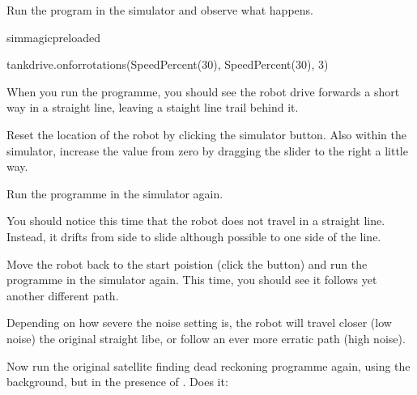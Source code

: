 \documentclass[letterpaper,10pt,english]{sphinxmanual}
\begin{document}
Run the program in the simulator and observe what happens.

{
\begin{sphinxVerbatim}[commandchars=\\\{\}]
\llap{\color{nbsphinxin}[ ]:\,\hspace{\fboxrule}\hspace{\fboxsep}}\PYGZpc{}\PYGZpc{}sim\PYGZus{}magic\PYGZus{}preloaded

tank\PYGZus{}drive.on\PYGZus{}for\PYGZus{}rotations(SpeedPercent(30), SpeedPercent(30), 3)
\end{sphinxVerbatim}
}

When you run the programme, you should see the robot drive forwards a short way in a straight line, leaving a staight line trail behind it.

Reset the location of the robot by clicking the simulator  button. Also within the simulator, increase the  value from zero by dragging the slider to the right a little way.

Run the programme in the simulator again.

You should notice this time that the robot does not travel in a straight line. Instead, it drifts from side to slide although possible to one side of the line.

Move the robot back to the start poistion (click the  button) and run the programme in the simulator again. This time, you should see it follows yet another different path.

Depending on how severe the noise setting is, the robot will travel closer (low noise) the original straight libe, or follow an ever more erratic path (high noise).

Now run the original satellite finding dead reckoning programme again, using the  background, but in the presence of . Does it:
\end{document}
